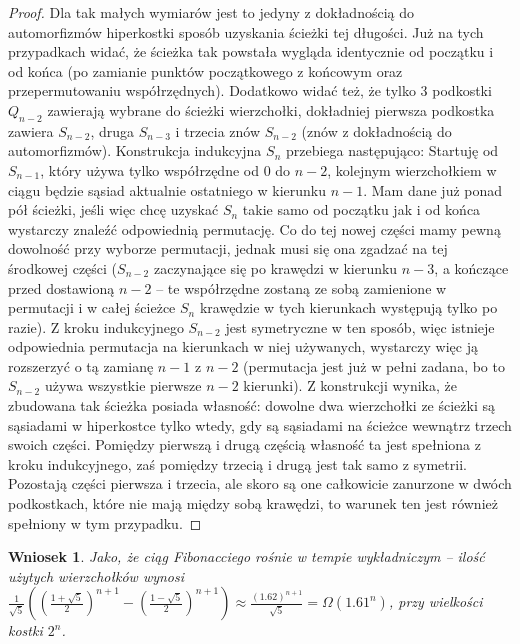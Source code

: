 \documentclass{pracamgr}
\newtheorem{corollary}[theorem]{Wniosek}
\begin{document}
\begin{proof}
     Dla tak małych wymiarów jest to jedyny z dokładnością do automorfizmów hiperkostki sposób uzyskania ścieżki tej długości.
     Już na tych przypadkach widać, że ścieżka tak powstała wygląda identycznie od początku i od końca
     (po zamianie punktów początkowego z końcowym oraz przepermutowaniu współrzędnych). Dodatkowo widać też,
     że tylko 3 podkostki $Q_{n-2}$ zawierają wybrane do ścieżki wierzchołki, dokładniej pierwsza podkostka zawiera $S_{n-2}$, druga $S_{n-3}$
     i trzecia znów $S_{n-2}$ (znów z dokładnością do automorfizmów).\newline
     Konstrukcja indukcyjna $S_n$ przebiega następująco:\newline
     Startuję od $S_{n-1}$, który używa tylko współrzędne od $0$ do $n-2$, kolejnym wierzchołkiem w ciągu będzie sąsiad aktualnie ostatniego w kierunku
     $n-1$. Mam dane już ponad pół ścieżki, jeśli więc chcę uzyskać $S_n$ takie samo od początku jak i od końca wystarczy znaleźć odpowiednią permutację.
     Co do tej nowej części mamy pewną dowolność przy wyborze permutacji, jednak musi się ona zgadzać na tej środkowej części
     ($S_{n-2}$ zaczynające się po krawędzi w kierunku $n-3$, a kończące przed dostawioną $n-2$ -- te współrzędne zostaną ze sobą zamienione w permutacji
     i w całej ścieżce $S_n$ krawędzie w tych kierunkach występują tylko po razie). Z kroku indukcyjnego $S_{n-2}$ jest symetryczne w ten sposób,
     więc istnieje odpowiednia permutacja na kierunkach w niej używanych, wystarczy więc ją rozszerzyć o tą zamianę $n-1$ z $n-2$
     (permutacja jest już w pełni zadana, bo to $S_{n-2}$ używa wszystkie pierwsze $n-2$ kierunki).
     Z konstrukcji wynika, że zbudowana tak ścieżka posiada własność: dowolne dwa wierzchołki ze ścieżki są sąsiadami w hiperkostce
     tylko wtedy, gdy są sąsiadami na ścieżce wewnątrz trzech swoich części. Pomiędzy pierwszą i drugą częścią własność ta jest spełniona z kroku indukcyjnego,
     zaś pomiędzy trzecią i drugą jest tak samo z symetrii. Pozostają części pierwsza i trzecia, ale skoro są one całkowicie zanurzone w dwóch podkostkach,
     które nie mają między sobą krawędzi, to warunek ten jest również spełniony w tym przypadku.
    \end{proof}
    \begin{corollary}\label{fibo -> wykladniczy}
     Jako, że ciąg Fibonacciego rośnie w tempie wykładniczym -- ilość użytych wierzchołków wynosi
     $\frac{1}{\sqrt{5}}((\frac{1+\sqrt{5}}{2})^{n+1}-(\frac{1-\sqrt{5}}{2})^{n+1})\approx \frac{(1.62)^{n+1}}{\sqrt{5}}=\Omega(1.61^n)$, przy wielkości kostki $2^n$.
    \end{corollary}
\end{document}
